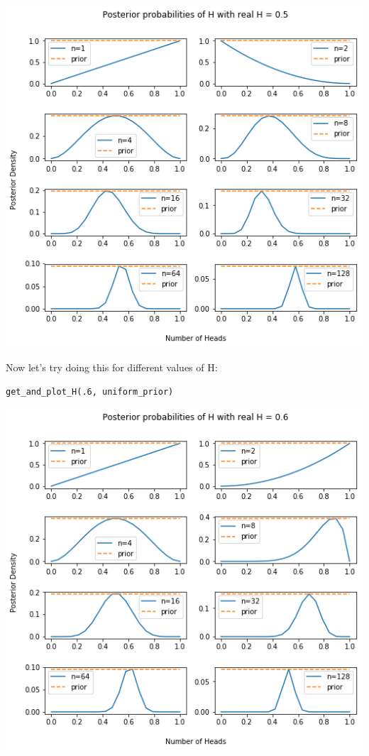 \documentclass[11pt]{article}
\begin{document}
\includegraphics[width=.9\linewidth]{./obipy-resources/3223KS.png}

Now let's try doing this for different values of H:

\begin{verbatim}
get_and_plot_H(.6, uniform_prior)
\end{verbatim}

\includegraphics[width=.9\linewidth]{./obipy-resources/322EVY.png}
\end{document}
